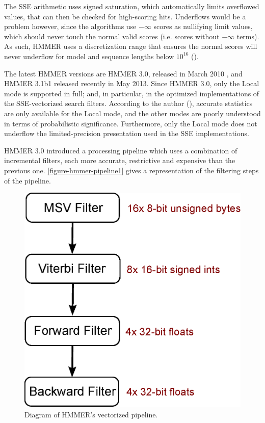 The SSE arithmetic uses signed saturation, which automatically limits overflowed values, that can then be checked for high-scoring hits. Underflows would be a problem however, since the algorithms use $-\infty$ scores as nullifying limit values, which should never touch the normal valid scores (i.e. scores without $-\infty$ terms). As such, HMMER uses a discretization range that ensures the normal scores will never underflow for model and sequence lengths below $10^{16}$ (\cite{hmmer3}).

The latest HMMER versions are HMMER 3.0, released in March 2010 \cite{hmmer3}, and HMMER 3.1b1 released recently in May 2013. 
Since HMMER 3.0, only the Local mode is supported in full; and, in particular, in the optimized implementations of the SSE-vectorized search filters. According to the author (\cite{hmmer-userguide}), accurate statistics are only available for the Local mode, and the other modes are poorly understood in terms of probabilistic significance. Furthermore, only the Local mode does not underflow the limited-precision presentation used in the SSE implementations.


\label{hmmer-pipeline}

HMMER 3.0 introduced a processing pipeline which uses a combination of incremental filters, each more accurate, restrictive and expensive than the previous one. \autoref{figure-hmmer-pipeline1} gives a representation of the filtering steps of the pipeline.

\begin{figure}[h!]
	\centering
	\includegraphics[scale=0.5]{img-hmm/hmmer-pipeline.eps}
	\caption{Diagram of HMMER's vectorized pipeline.}
	\label{figure-hmmer-pipeline1}
\end{figure}

